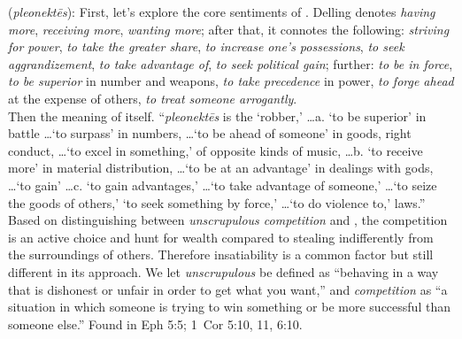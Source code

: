 \item[Unscrupulous competition,]

(\textit{pleonektēs}):
First, let's explore the core sentiments of . Delling denotes \emph{having more}, \emph{receiving more}, \emph{wanting more}; after that, it connotes the following: \emph{striving for power}, \emph{to take the greater share}, \emph{to increase one's possessions}, \emph{to seek aggrandizement}, \emph{to take advantage of}, \emph{to seek political gain}; further: \emph{to be in force}, \emph{to be superior} in number and weapons, \emph{to take precedence} in power, \emph{to forge ahead} at the expense of others, \emph{to treat someone arrogantly}.\\Then the meaning of  itself. ``\emph{pleonektēs} is the `robber,' \ldots a. `to be superior' in battle \ldots `to surpass' in numbers, \ldots `to be ahead of someone' in goods, right conduct, \ldots `to excel in something,' of opposite kinds of music, \ldots b. `to receive more' in material distribution, \ldots `to be at an advantage' in dealings with gods, \ldots `to gain' \ldots c. `to gain advantages,' \ldots `to take advantage of someone,' \ldots `to seize the goods of others,' `to seek something by force,' \ldots `to do violence to,' laws.'' Based on distinguishing between \emph{unscrupulous competition} and , the competition is an active choice and hunt for wealth compared to stealing indifferently from the surroundings of others. Therefore insatiability is a common factor but still different in its approach. We let \emph{unscrupulous} be defined as ``behaving in a way that is dishonest or unfair in order to get what you want,'' and \emph{competition} as ``a situation in which someone is trying to win something or be more successful than someone else.''
Found in Eph 5:5; 1~Cor 5:10, 11, 6:10.
